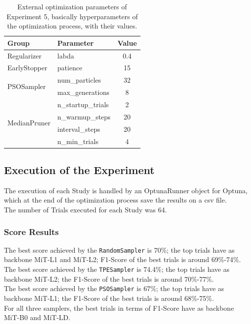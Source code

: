 \begin{table}[ht!]
	\center
	\setlength{\tabcolsep}{0.5cm}
	\caption[Optimization External Parameters of Experiment 5]{External optimization parameters of Experiment 5, basically hyperparameters of the optimization process, with their values.}
	\begin{tabular}{@{}llc@{}}
		\toprule
		\textbf{Group}                & \textbf{Parameter} & \textbf{Value} \\ \midrule
		Regularizer                   & labda              & 0.4            \\[0.1cm]
		EarlyStopper                  & patience           & 15             \\[0.2cm]
		\multirow{2}{*}{PSOSampler}   & num\_particles     & 32             \\[0.1cm]
									  & max\_generations   & 8              \\[0.2cm]
		\multirow{4}{*}{MedianPruner} & n\_startup\_trials & 2              \\[0.1cm]
									  & n\_warmup\_steps   & 20             \\[0.1cm]
									  & interval\_steps    & 20             \\[0.1cm]
									  & n\_min\_trials     & 4              \\ \bottomrule
	\end{tabular}
	\label{tab:table-4.5.2}
\end{table}

\subsection{Execution of the Experiment}

The execution of each Study is handled by an OptunaRunner object for Optuna, which at the end of the optimization process save the results on a csv file.
\\[0.3cm]The number of Trials executed for each Study was 64.

\subsubsection{Score Results}

The best score achieved by the \texttt{RandomSampler} is 70\%; the top trials have as backbone MiT-L1 and MiT-L2; F1-Score of the best trials is around 69\%-74\%.
\\[0.3cm]The best score achieved by the \texttt{TPESampler} is 74.4\%; the top trials have as backbone MiT-L2; the F1-Score of the best trials is around 70\%-77\%.
\\[0.3cm]The best score achieved by the \texttt{PSOSampler} is 67\%; the top trials have as backbone MiT-L1; the F1-Score of the best trials is around 68\%-75\%.
\\[0.3cm]For all three samplers, the best trials in terms of F1-Score have as backbone MiT-B0 and MiT-LD.

